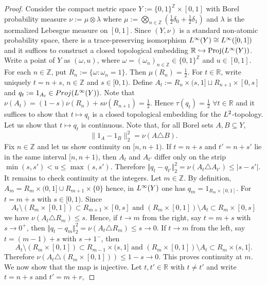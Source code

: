 \documentclass[10pt,a4paper]{amsart}
\DeclareMathOperator{\Proj}{Proj}
\newcommand{\R}{\mathbb{R}}
\newcommand{\Z}{\mathbb{Z}}
\begin{document}
\begin{proof}
Consider the compact metric space $Y:=\{0,1\}^{\mathbb Z}\times[0,1]$ with Borel probability measure
$\nu
        :=
       \mu\otimes \lambda$ where $\mu:=\bigotimes_{n\in\mathbb Z}
        \left(\frac12\delta_0+\frac12\delta_1\right)$ and $\lambda$ is the normalized Lebesgue measure on $[0,1]$. Since \((Y,\nu)\) is a standard non-atomic probability space, there is a
trace-preserving isomorphism ${\rm L}^\infty(Y)\cong {\rm L}^\infty([0,1])$ and it suffices to construct a closed topological embedding $\mathbb R\hookrightarrow \Proj({\rm L}^\infty(Y))$.
\medskip
\noindent Write a point of \(Y\) as \((\omega,u)\), where $\omega=(\omega_n)_{n\in\mathbb Z}\in\{0,1\}^{\mathbb Z}$ and $u\in[0,1]$. For each \(n\in\mathbb Z\), put $R_n:=\{\omega:\omega_n=1\}$. Then $\mu(R_n)=\frac12$. For \(t\in\mathbb R\), write uniquely $t=n+s$, $n\in\mathbb Z$ and  $s\in[0,1)$. Define
$A_t:=R_n\times(s,1]\sqcup R_{n+1}\times[0,s]$ and  $q_t:=1_{A_t}\in {\rm Proj}({\rm L}^\infty(Y))$. Note that $\nu(A_t)=(1-s)\nu(R_n)+s\nu(R_{n+1})=\frac12$. Hence $\tau(q_t)=\frac12$ $\forall t\in\mathbb R$ and it suffices to show that    $t\mapsto q_t$ is a closed topological embedding for the \({\rm L}^2\)-topology.
\medskip
\noindent Let us show that $t\mapsto q_t$ is continuous. Note that, for all Borel sets $A,B\subseteq Y$,
$$\|1_A-1_B\|_2^2=\nu(A\triangle B).$$
Fix $n\in\Z$ and let us show continuity on $[n,n+1)$. If \(t=n+s\) and \(t'=n+s'\) lie in the same interval
\([n,n+1)\), then \(A_t\) and \(A_{t'}\) differ only on the strip $\min(s,s')<u\leq \max(s,s')$. Therefore
$\Vert q_t-q_{t'}\Vert_2^2
        =
        \nu(A_t\triangle A_{t'})
        \leq |s-s'|$. It remains to check continuity at the integers. Let \(m\in\mathbb Z\). By
definition, $A_m=R_m\times(0,1]\cup R_{m+1}\times\{0\}$ hence, in ${\rm L}^\infty(Y)$ one has $q_m=1_{{R_m}\times[0,1]}$. For $t=m+s$ with $s\in [0,1)$. Since
$$A_t\setminus\left(R_m\times[0,1]\right)\subset R_{m+1}\times[0,s]\text{ and }\left(R_m\times[0,1]\right)\setminus A_t\subset R_m\times[0,s]$$
we have $ \nu(A_t\triangle R_m)\leq s$. Hence, if \(t\to m\) from the right, say \(t=m+s\) with \(s\to0^+\), then $\Vert q_t-q_m\Vert_2^2=\nu(A_t\triangle R_m)\leq s\to0$. If \(t\to m\) from the left, say \(t=(m-1)+s\) with \(s\to1^-\), then
$$A_t\setminus(R_m\times[0,1])\subset R_{m-1}\times(s,1]\text{ and }(R_m\times[0,1])\setminus A_t\subset R_m\times(s,1].$$
Therefore $\nu(A_t\triangle(R_m\times[0,1]))\leq 1-s\to0$. This proves continuity at \(m\).
\medskip
\noindent We now show that the map is injective. Let $t,t'\in\R$ with $t\neq t'$ and write $t=n+s$ and $t'=m+r,$

\end{proof}
\end{document}
